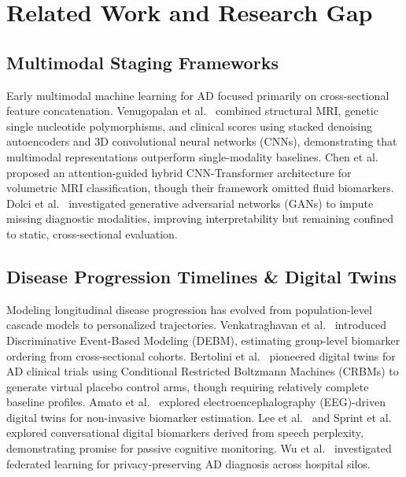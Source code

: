 \documentclass[11pt,a4paper]{article}
\begin{document}
\section{Related Work and Research Gap}
\label{sec:related_work}

\subsection{Multimodal Staging Frameworks}
Early multimodal machine learning for AD focused primarily on cross-sectional feature concatenation. Venugopalan et al.~\cite{venugopalan2021multimodal} combined structural MRI, genetic single nucleotide polymorphisms, and clinical scores using stacked denoising autoencoders and 3D convolutional neural networks (CNNs), demonstrating that multimodal representations outperform single-modality baselines. Chen et al.~\cite{chen2022attention} proposed an attention-guided hybrid CNN-Transformer architecture for volumetric MRI classification, though their framework omitted fluid biomarkers. Dolci et al.~\cite{dolci2024gans} investigated generative adversarial networks (GANs) to impute missing diagnostic modalities, improving interpretability but remaining confined to static, cross-sectional evaluation.

\subsection{Disease Progression Timelines & Digital Twins}
Modeling longitudinal disease progression has evolved from population-level cascade models to personalized trajectories. Venkatraghavan et al.~\cite{venkatraghavan2019debm} introduced Discriminative Event-Based Modeling (DEBM), estimating group-level biomarker ordering from cross-sectional cohorts. Bertolini et al.~\cite{bertolini2021digitaltwins} pioneered digital twins for AD clinical trials using Conditional Restricted Boltzmann Machines (CRBMs) to generate virtual placebo control arms, though requiring relatively complete baseline profiles. Amato et al.~\cite{amato2025eeg} explored electroencephalography (EEG)-driven digital twins for non-invasive biomarker estimation. Lee et al.~\cite{lee2023conversational} and Sprint et al.~\cite{sprint2024language} explored conversational digital biomarkers derived from speech perplexity, demonstrating promise for passive cognitive monitoring. Wu et al.~\cite{wu2022federated} investigated federated learning for privacy-preserving AD diagnosis across hospital silos.
\end{document}
